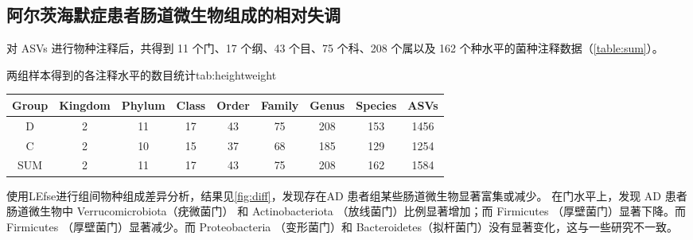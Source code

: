 \documentclass[supercite]{HustGraduPaper}
\begin{document}
\subsection{阿尔茨海默症患者肠道微生物组成的相对失调}
对 ASVs 进行物种注释后，共得到 11 个门、17 个纲、43 个目、75 个科、208 个属以及 162 个种水平的菌种注释数据（\autoref{table:sum}）。
\begin{generaltab}{两组样本得到的各注释水平的数目统计}{tab:heightweight}
	\begin{tabular}{c|c|c|c|c|c|c|c|c}
		\toprule
		Group & Kingdom & Phylum & Class & Order & Family & Genus & Species & ASVs\\
		\midrule
		D & 2 & 11 & 17 & 43 & 75 & 208 & 153 & 1456 \\ 
        C & 2 & 10 & 15 & 37 & 68 & 185 & 129 & 1254 \\ 
        SUM & 2 & 11 & 17 & 43 & 75 & 208 & 162 & 1584 \\     
		\bottomrule
		
	\end{tabular}
	\label{table:sum}
\end{generaltab}
使用LEfse进行组间物种组成差异分析，结果见\autoref{fig:diff}，发现存在AD 患者组某些肠道微生物显著富集或减少。
在门水平上，发现 AD 患者肠道微生物中 Verrucomicrobiota（疣微菌门） 和 Actinobacteriota （放线菌门）比例显著增加；而 Firmicutes （厚壁菌门）显著下降。而 Firmicutes （厚壁菌门）显著减少。而 Proteobacteria （变形菌门）和 Bacteroidetes（拟杆菌门）没有显著变化，这与一些研究不一致\cite{zhuang22018gut}\cite{liu2019altered}。
\end{document}
